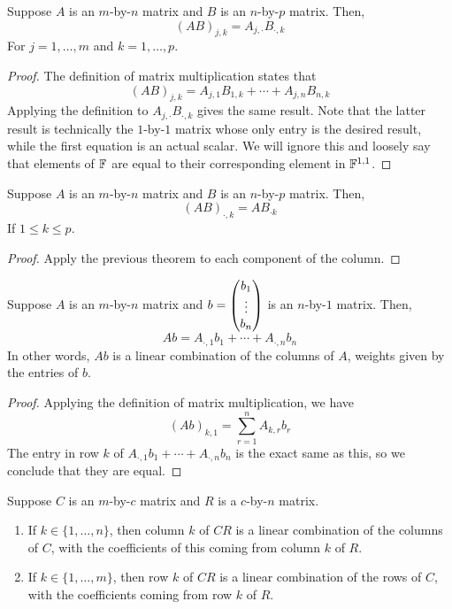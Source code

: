 \begin{theorem}
    Suppose $A$ is an $m$-by-$n$ matrix and $B$ is an $n$-by-$p$ matrix. Then,
    \[ (AB)_{j,k} = A_{j, \cdot}B_{\cdot, k} \]
    For $j = 1, \dots, m$ and $k = 1, \dots, p$.
\end{theorem}
\begin{proof}
    The definition of matrix multiplication states that
    \[ (AB)_{j,k} = A_{j,1}B_{1,k} + \cdots + A_{j, n}B_{n,k} \]
    Applying the definition to $A_{j, \cdot}B_{\cdot, k}$ gives the same result. Note that the latter result is technically the $1$-by-$1$ matrix whose only entry is the desired result, while the first equation is an actual scalar. We will ignore this and loosely say that elements of $\mathbb F$ are equal to their corresponding element in $\mathbb F^{1,1}$.  
\end{proof}
\begin{theorem}
    Suppose $A$ is an $m$-by-$n$ matrix and $B$ is an $n$-by-$p$ matrix. Then,
    \[ (AB)_{\cdot, k} = AB_{\cdot k}\]
    If $1\le k \le p$.
\end{theorem}
\begin{proof}
    Apply the previous theorem to each component of the column.
\end{proof}
\begin{theorem}
    Suppose $A$ is an $m$-by-$n$ matrix and $b = \begin{pmatrix}b_1 \\ \vdots \\ b_n\end{pmatrix}$ is an $n$-by-$1$ matrix. Then,
    \[ Ab = A_{\cdot, 1} b_1 + \cdots + A_{\cdot, n} b_n\]
    In other words, $Ab$ is a linear combination of the columns of $A$, weights given by the entries of $b$.
\end{theorem}
\begin{proof}
    Applying the definition of matrix multiplication, we have
    \[ (Ab)_{k, 1} = \sum_{r=1}^n A_{k, r}b_r\]
    The entry in row $k$ of $A_{\cdot, 1}b_1 + \cdots + A_{\cdot, n}b_n$ is the exact same as this, so we conclude that they are equal.
\end{proof}
\newpage
\begin{theorem}
    Suppose $C$ is an $m$-by-$c$ matrix and $R$ is a $c$-by-$n$ matrix.
    \begin{enumerate}
        \item If $k\in \{1, \dots, n\}$, then column $k$ of $CR$ is a linear combination of the columns of $C$, with the coefficients of this coming from column $k$ of $R$.
        \item If $k\in \{1, \dots, m\}$, then row $k$ of $CR$ is a linear combination of the rows of $C$, with the coefficients coming from row $k$ of $R$.
    \end{enumerate}
\end{theorem}
